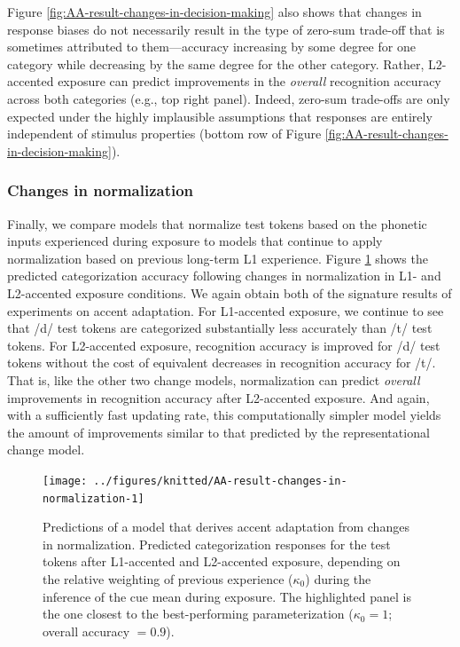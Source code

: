 \documentclass[
  11pt,
  english,
  man,floatsintext]{apa6}
\begin{document}
Figure \ref{fig:AA-result-changes-in-decision-making} also shows that changes in response biases do not necessarily result in the type of zero-sum trade-off that is sometimes attributed to them---accuracy increasing by some degree for one category while decreasing by the same degree for the other category. Rather, L2-accented exposure can predict improvements in the \emph{overall} recognition accuracy across both categories (e.g., top right panel). Indeed, zero-sum trade-offs are only expected under the highly implausible assumptions that responses are entirely independent of stimulus properties (bottom row of Figure \ref{fig:AA-result-changes-in-decision-making}).

\hypertarget{changes-in-normalization-1}{%
\subsubsection{Changes in normalization}\label{changes-in-normalization-1}}

Finally, we compare models that normalize test tokens based on the phonetic inputs experienced during exposure to models that continue to apply normalization based on previous long-term L1 experience. Figure \ref{fig:AA-result-changes-in-normalization} shows the predicted categorization accuracy following changes in normalization in L1- and L2-accented exposure conditions. We again obtain both of the signature results of experiments on accent adaptation. For L1-accented exposure, we continue to see that /d/ test tokens are categorized substantially less accurately than /t/ test tokens. For L2-accented exposure, recognition accuracy is improved for /d/ test tokens without the cost of equivalent decreases in recognition accuracy for /t/. That is, like the other two change models, normalization can predict \emph{overall} improvements in recognition accuracy after L2-accented exposure. And again, with a sufficiently fast updating rate, this computationally simpler model yields the amount of improvements similar to that predicted by the representational change model.



\begin{figure}

{\centering \texttt{[image: ../figures/knitted/AA-result-changes-in-normalization-1]} 

}

\caption{Predictions of a model that derives accent adaptation from changes in normalization. Predicted categorization responses for the test tokens after L1-accented and L2-accented exposure, depending on the relative weighting of previous experience (\(\kappa_0\)) during the inference of the cue mean during exposure. The highlighted panel is the one closest to the best-performing parameterization (\(\kappa_0 = 1\); overall accuracy \(=0.9\)).}\label{fig:AA-result-changes-in-normalization}
\end{figure}
\end{document}
